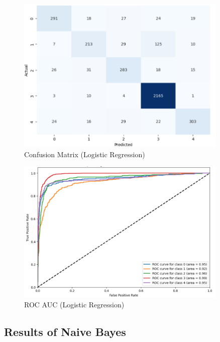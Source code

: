 \begin{figure}[h!]  
    \centering
    \includegraphics[width=0.9\textwidth]{Images/LR Confusion Matrix.png}  
    \caption{Confusion Matrix (Logistic Regression)}
    \label{LRCM}  %
\end{figure}

\begin{figure}[h!]  
    \centering
    \includegraphics[width=0.9\textwidth]{Images/LR ROC.png}  
    \caption{ROC AUC (Logistic Regression)}
    \label{LRROC}  %
\end{figure}

\pagebreak

\subsection{Results of Naive Bayes}

